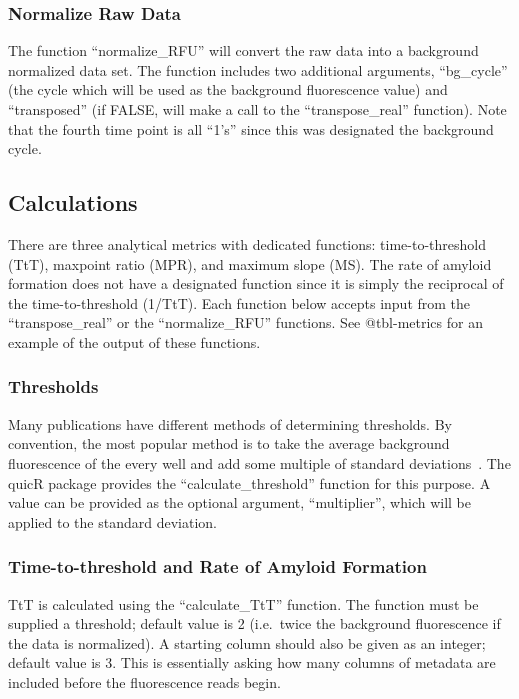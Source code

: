 \documentclass[preprint,12pt, a4paper]{elsarticle}
\begin{document}
        \subsubsection{Normalize Raw Data}
            The function ``normalize\_RFU'' will convert the raw data into a background normalized data set. The function includes two additional arguments, ``bg\_cycle'' (the cycle which will be used as the background fluorescence value) and ``transposed'' (if FALSE, will make a call to the ``transpose\_real'' function). Note that the fourth time point is all ``1's'' since this was designated the background cycle.

    \subsection{Calculations}
        There are three analytical metrics with dedicated functions: time-to-threshold (TtT), maxpoint ratio (MPR), and maximum slope (MS). The rate of amyloid formation does not have a designated function since it is simply the reciprocal of the time-to-threshold (1/TtT). Each function below accepts input from the ``transpose\_real'' or the ``normalize\_RFU'' functions. See @tbl-metrics for an example of the output of these functions.

        \subsubsection{Thresholds}
            Many publications have different methods of determining thresholds. By convention, the most popular method is to take the average background fluorescence of the every well and add some multiple of standard deviations~\cite{Rowden2023}. The quicR package provides the ``calculate\_threshold'' function for this purpose. A value can be provided as the optional argument, ``multiplier'', which will be applied to the standard deviation.

        \subsubsection{Time-to-threshold and Rate of Amyloid Formation}
            TtT is calculated using the ``calculate\_TtT'' function. The function must be supplied a threshold; default value is 2 (i.e.\ twice the background fluorescence if the data is normalized). A starting column should also be given as an integer; default value is 3. This is essentially asking how many columns of metadata are included before the fluorescence reads begin. 
\end{document}
